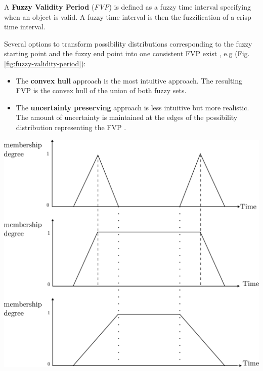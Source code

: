 \begin{definition}
A \textbf{Fuzzy Validity Period} (\emph{FVP}) is defined as a fuzzy time interval specifying when an object is valid. A fuzzy time interval is then the fuzzification of a crisp time interval.
\end{definition}
Several options to transform possibility distributions corresponding to the fuzzy starting point and the fuzzy end point into one consistent FVP exist \cite{Garrido2009}, e.g (Fig. \ref{fig:fuzzy-validity-period}):
\begin{itemize}
\item The \textbf{convex hull} approach is the most intuitive approach. The resulting FVP is the convex hull of the union of both fuzzy sets.
\item The \textbf{uncertainty preserving} approach is less intuitive but more realistic. The amount of uncertainty is maintained at the edges of the possibility distribution representing the FVP \cite{Garrido2009}.
\end{itemize}

\vspace*{13pt}
\begin{center}
{
\includegraphics[scale=0.25]{./graphs/comparisoncv.pdf}

}
\end{center}
\vspace*{10pt}
\vspace*{13pt}

